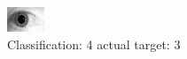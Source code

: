 \begin{figure}[h!]
\begin{center}
\includegraphics[width=0.60\columnwidth]{figures/ID1804_class_4_target_3.png}
\end{center}
\caption{ Classification: 4 actual target: 3}
\label{fig:ID1804_class_4_target_3}
\end{figure}
